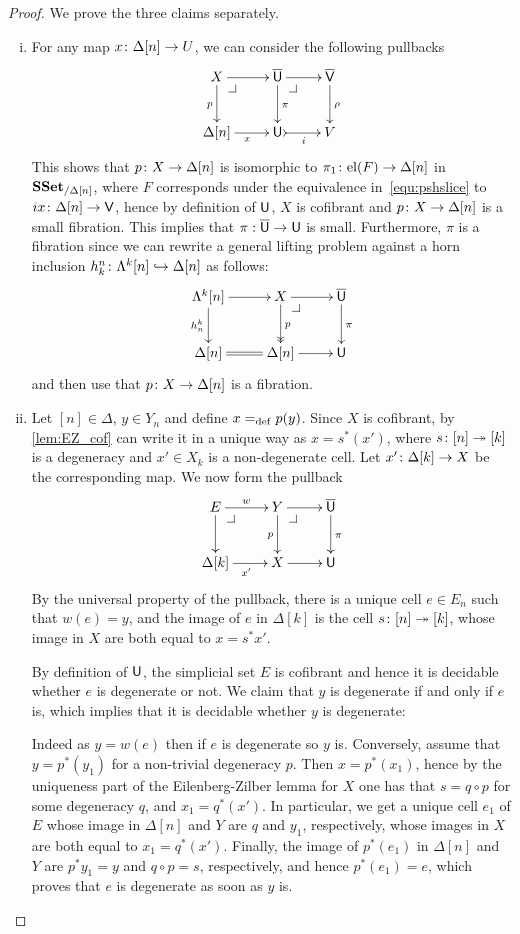 \documentclass[reqno,10pt,a4paper,oneside,draft]{amsart}
\begin{document}
\begin{proof} We prove the three claims separately.
\begin{enumerate}[(i)] 
\item For any map $x \colon \Delta[n] \rightarrow U$, we can consider the following pullbacks
\[
\xymatrix{
X \ar[r] \ar[d]_p \drpullback & \UU \ar[d]^\pi \ar[r]  \drpullback & \VV \ar[d]^{\rho} \\
\Delta[n] \ar[r]_{x} & \U \ar@{>->}[r]_{i} & V }
\]
This shows that $p \colon X \rightarrow \Delta[n]$ is isomorphic to $\pi_1 \colon \mathrm{el}(F) \rightarrow \Delta[n]$ in $\mathbf{SSet}_{/ \Delta[n]}$, where $F$ corresponds under the equivalence in~\eqref{equ:pshslice} to 
$i x \colon \Delta[n] \rightarrow \mathsf{V}$, hence by definition of $\mathsf{U}$, $X$ is cofibrant and $p \colon X \rightarrow \Delta[n]$ is a small fibration. This implies that $\pi:\overline{\mathsf{U}} \rightarrow \mathsf{U}$ is small. Furthermore, $\pi$ is a fibration
since we can rewrite a general lifting problem against a horn inclusion $h^n_k \colon \Lambda^k[n] \hookrightarrow \Delta[n]$ as follows:
\[
\xymatrix{
\Lambda^k[n] \ar[r] \ar[d]_{h^k_n} & X \drpullback \ar@{->>}[d]^{p} \ar[r] & \UU \ar[d]^\pi \\
\Delta[n] \ar@{=}[r]  & \Delta[n] \ar[r] & \U  }
\]
and then use that $p \colon X \to \Delta[n]$ is a fibration.
\item  Let $[n] \in \Delta$, $y \in Y_n$ and define $x =_{\operatorname{def}} p(y)$. Since $X$ is cofibrant, by \cref{lem:EZ_cof} can write it in a unique way as $x=s^*(x')$, where $s \colon [n] \twoheadrightarrow [k]$ is a degeneracy and 
$x' \in X_k$ is a non-degenerate cell. Let $x' \colon \Delta[k] \rightarrow X$ be the corresponding map. We now form the pullback
\[
\xymatrix{
E \ar[r]^w \ar[d] \drpullback & Y \ar[r] \ar[d]_{p} \drpullback & \UU \ar[d]^\pi \\
\Delta[k] \ar[r]_{x'} & X \ar[r] & \U }
\]
By the universal property of the pullback, there is a unique cell $e \in E_n$ such that $w(e)=y$, and the image of $e$ in $\Delta[k]$ is the cell $s \colon [n] \twoheadrightarrow [k]$, whose image in $X$ are both equal to $x=s^* x'$.

By definition of $\mathsf{U}$, the simplicial set $E$ is cofibrant and hence it is decidable whether $e$ is degenerate or not. We claim that $y$ is degenerate if and only if $e$ is, which implies that it is decidable whether $y$ is degenerate:

Indeed as $y = w(e)$ then if $e$ is degenerate so $y$ is. Conversely, assume that $y=p^*(y_1)$ for a non-trivial degeneracy $p$. Then $x=p^*(x_1)$, hence by the uniqueness part of the Eilenberg-Zilber lemma for $X$ one has that $s=q \circ p$ for some degeneracy $q$, and $x_1 = q^*(x')$. In particular, we get a unique cell $e_1$ of $E$ whose image in $\Delta[n]$ and $Y$ are  $q$ and $y_1$, respectively, whose images in $X$ are both equal to $x_1=q^*(x')$. Finally, the image of $p^*(e_1)$ in $\Delta[n]$ and~$Y$ are  $p^* y_1 =y$ and $q \circ p =s$, respectively, and hence $p^*(e_1) =e$, which proves that $e$ is degenerate as soon as $y$ is.




\end{enumerate}
\end{proof}
\end{document}
